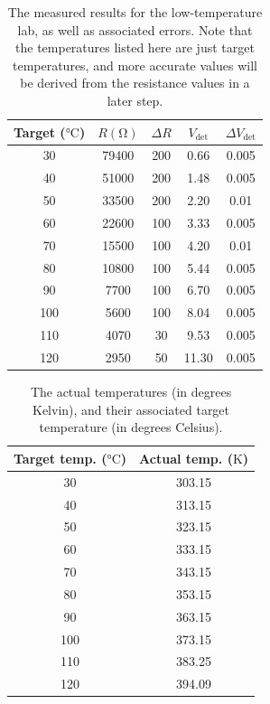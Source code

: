 \documentclass[%
 reprint,
superscriptaddress,
 amsmath,amssymb,
 aps,
]{revtex4-1}
\begin{document}
\begin{table}
    \begin{tabular}{ccccc}
        \hline \hline
        Target ($\si{\celsius}$) & $R (\si{\ohm}) $ & $\Delta R$ & $V_{\text{det}}$ & $\Delta V_{\text{det}}$ \\ \hline
        30 & 79400 & 200 & 0.66 & 0.005 \\
        40 & 51000 & 200 & 1.48 & 0.005 \\
        50 & 33500 & 200 & 2.20 & 0.01 \\
        60 & 22600 & 100 & 3.33 & 0.005 \\
        70 & 15500 & 100 & 4.20 & 0.01 \\
        80 & 10800 & 100 & 5.44 & 0.005 \\
        90 & 7700 & 100 & 6.70 & 0.005 \\
        100 & 5600 & 100 & 8.04 & 0.005 \\
        110 & 4070 & 30 & 9.53 & 0.005 \\
        120 & 2950 & 50 & 11.30 & 0.005 \\ \hline \hline
    \end{tabular}
    \caption{The measured results for the low-temperature lab, as well as associated errors. Note that the temperatures listed here are just target temperatures, and more accurate values will be derived from the resistance values in a later step.}
    \label{LT-data}
\end{table}

\begin{table}
    \begin{tabular}{cc} \hline \hline
        Target temp. ($\si{\celsius}$) & Actual temp. ($\si{\kelvin}$) \\ \hline
            30 & 303.15 \\
            40 & 313.15 \\
            50 & 323.15 \\
            60 & 333.15 \\
            70 & 343.15 \\
            80 & 353.15 \\
            90 & 363.15 \\
            100 & 373.15 \\
            110 & 383.25 \\
            120 & 394.09 \\ \hline \hline
    \end{tabular}
    \caption{The actual temperatures (in degrees Kelvin), and their associated target temperature (in degrees Celsius).}
    \label{calc-temps-lt}

\end{table}
\end{document}
